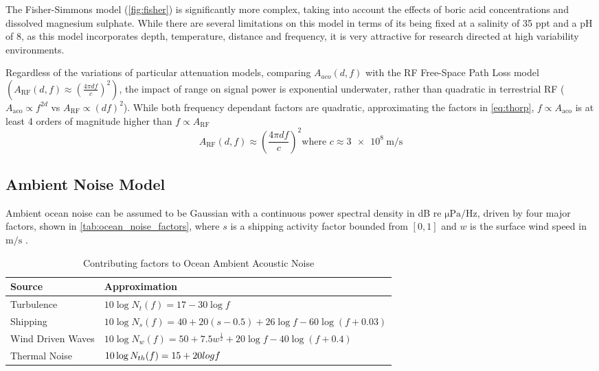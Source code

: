 %
The Fisher-Simmons model (\autoref{fig:fisher}) is significantly more complex, taking into account the effects of boric acid concentrations and dissolved magnesium sulphate. While there are several limitations on this model in terms of its being fixed at a salinity of 35 ppt and a pH of 8, as this model incorporates depth, temperature, distance and frequency, it is very attractive for research directed at high variability environments.




Regardless of the variations of particular attenuation models, comparing $A_{aco}(d,f)$ with the RF Free-Space Path Loss model $(A_{\text{RF}}(d,f) \approx \left( \frac{4\pi d f}{c} \right)^2)$, the impact of range on signal power is exponential underwater, rather than quadratic in terrestrial RF ($A_{\text{aco}} \propto f^{2d}$ vs $A_{\text{RF}} \propto (df)^2$). 
While both frequency dependant factors are quadratic, approximating the factors in \eqref{eq:thorp}, $f\propto A_{\text{aco}}$ is at least 4 orders of magnitude higher than $f\propto A_{\text{RF}}$
\begin{equation}
  \label{eq:fspl}
  A_{\text{RF}}(d,f) \approx \left( \frac{4\pi d f}{c} \right)^2
  \text{where }c\approx \SI{3e8}{\meter\per\second}
\end{equation}


 \subsection{Ambient Noise Model}

 Ambient ocean noise can be assumed to be Gaussian with a continuous power spectral density in dB re $\si{\micro\pascal\per\hertz}$, driven by four major factors, shown in \autoref{tab:ocean_noise_factors}, where $s$ is a shipping activity factor bounded from $[0,1]$ and $w$ is the surface wind speed in $\si{\meter\per\second}$ \cite{coates1989}.

\begin{table}[h]\centering
  \caption{Contributing factors to Ocean Ambient Acoustic Noise}
  \label{tab:ocean_noise_factors}
  \begin{tabularx}{\textwidth}{p{3.5cm} X}\toprule
    Source & Approximation \\ \midrule
    Turbulence & $10 \log N_t(f)=17-30\log f$\\
    Shipping & $10 \log N_s(f) = 40+20(s-0.5)+26\log f-60\log(f+0.03)$\\
    Wind Driven Waves & $10\log N_w(f) = 50+7.5w^{\frac{1}{2}}+20\log f - 40\log(f+0.4)$\\ 
    Thermal Noise & $10\log N_{th}(f) = \-15 + 20 log f$\\\bottomrule
  \end{tabularx}
\end{table}

